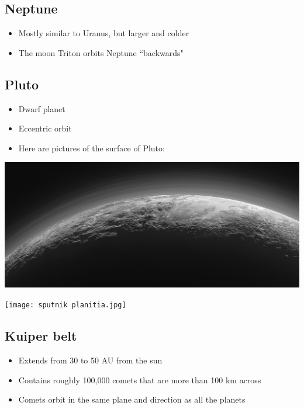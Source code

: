 \documentclass[class=article, crop=false]{standalone}
\begin{document}
\subsection{Neptune}
\begin{itemize}
    \item Mostly similar to Uranus, but larger and colder
    \item The moon Triton orbits Neptune ``backwards"
\end{itemize}
\subsection{Pluto}
\begin{itemize}
    \item Dwarf planet
    \item Eccentric orbit
    \item Here are pictures of the surface of Pluto:
\end{itemize}
\begin{center}
    \includegraphics[width=\textwidth]{pluto surface.jpg}
\end{center}
\begin{center}
    \texttt{[image: sputnik planitia.jpg]}
\end{center}
\subsection{Kuiper belt}
\begin{itemize}
    \item Extends from 30 to 50 AU from the sun
    \item Contains roughly 100,000 comets that are more than 100 km across
    \item Comets orbit in the same plane and direction as all the planets
\end{itemize}
\end{document}
